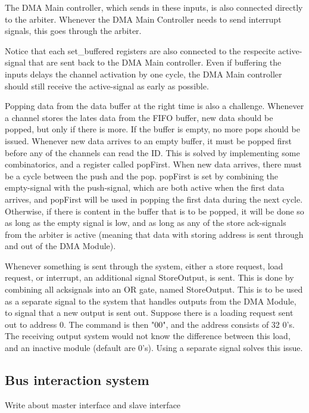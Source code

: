 The DMA Main controller, which sends in these inputs, is also connected directly to the arbiter.
Whenever the DMA Main Controller needs to send interrupt signals, this goes through the arbiter.

Notice that each set\_buffered registers are also connected to the respecite active-signal that are sent back to the DMA Main controller.
Even if buffering the inputs delays the channel activation by one cycle, the DMA Main controller should still receive the active-signal as early as possible.

Popping data from the data buffer at the right time is also a challenge.
Whenever a channel stores the lates data from the FIFO buffer, new data should be popped, but only if there is more.
If the buffer is empty, no more pops should be issued.
Whenever new data arrives to an empty buffer, it must be popped first before any of the channels can read the ID.
This is solved by implementing some combinatorics, and a register called popFirst.
When new data arrives, there must be a cycle between the push and the pop.
popFirst is set by combining the empty-signal with the push-signal, which are both active when the first data arrives, and popFirst will be used in popping the first data during the next cycle.
Otherwise, if there is content in the buffer that is to be popped, it will be done so as long as the empty signal is low, and as long as any of the store ack-signals from the arbiter is active (meaning that data with storing address is sent through and out of the DMA Module).

Whenever something is sent through the system, either a store request, load request, or interrupt, an additional signal StoreOutput, is sent.
This is done by combining all ack\-signals into an OR gate, named StoreOutput.
This is to be used as a separate signal to the system that handles outputs from the DMA Module, to signal that a new output is sent out.
Suppose there is a loading request sent out to address 0.
The command is then "00", and the address consists of 32 0's.
The receiving output system would not know the difference between this load, and an inactive module (default are 0's).
Using a separate signal solves this issue.

\subsection{Bus interaction system}
Write about master interface and slave interface


